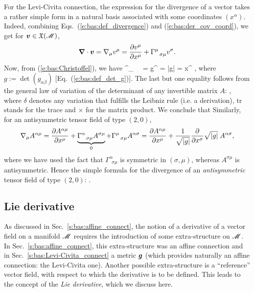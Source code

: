 For the Levi-Civita connection, the expression for the divergence of a vector takes
a rather simple form in a natural basis associated with some coordinates $(x^\alpha)$.
Indeed, combining Eqs.~(\ref{e:bas:def_divergence}) and (\ref{e:bas:der_cov_coord}),
we get for $\bm{v}\in\mathfrak{X}(\mathscr{M})$,
\[
  \bm{\nabla}\cdot\bm{v} = \nabla_\mu v^\mu = \frac{\partial v^\mu}{\partial x^\mu} + \Gamma^\mu_{\ \ \sigma\mu} v^\sigma   .
\]
Now, from (\ref{e:bas:Christoffel}),  we have
\be \label{e:bas:trGam_det_g}
  \Gamma^\mu_{\ \ \alpha\mu} =   g^{\mu\nu} 
  =   \ln|g|
  = \der{} {x^\alpha}  ,
\ee
where $g := \det(g_{\alpha\beta})$ [Eq.~(\ref{e:bas:def_det_g})].
The last but one equality follows from the general law of variation of the determinant of any
invertible matrix $A$:
\be \label{e:bas:variation_det}
     ,
\ee
where $\delta$ denotes any variation that fulfills the Leibniz rule (i.e. a derivation),
$\mathrm{tr}$ stands for the trace and $\times$ for the matrix product.
We conclude that
\be \label{e:bas:div_vect}
\ee
Similarly, for an antisymmetric tensor field of type $(2,0)$,
\[
   \nabla_\mu A^{\alpha\mu}
  = \frac{\partial A^{\alpha\mu}}{\partial x^\mu} +
  \underbrace{\Gamma^\alpha_{\ \ \sigma\mu} A^{\sigma\mu}}_{0}
  + \Gamma^\mu_{\ \ \sigma\mu} A^{\alpha\sigma}
  = \frac{\partial A^{\alpha\mu}}{\partial x^\mu} +  \frac{1}{\sqrt{|g|}}\frac{\partial }{\partial x^\sigma} \sqrt{|g|}
  \;  A^{\alpha\sigma} ,
\]
where we have used the fact that $\Gamma^\alpha_{\ \ \sigma\mu}$ is symmetric in
$(\sigma,\mu)$, whereas $A^{\sigma\mu}$ is antisymmetric.
Hence the simple formula for the divergence of an \emph{antisymmetric} tensor field
of type $(2,0)$:
\be \label{e:bas:div_antisym}
   .
\ee


\subsection{Lie derivative} \label{s:bas:Lie}

As discussed in Sec.~\ref{s:bas:affine_connect}, the notion of a derivative of a vector field on a manifold $\mathscr{M}$
requires the introduction of some extra-structure on $\mathscr{M}$.
In Sec.~\ref{s:bas:affine_connect}, this extra-structure was an affine connection
and in Sec.~\ref{s:bas:Levi-Civita_connect} a metric
$\bm{g}$ (which provides naturally an affine connection: the Levi-Civita one).
Another possible extra-structure is a ``reference''
vector field, with respect to which the derivative is to be defined. This leads to the
concept of the \emph{Lie derivative}, which we discuss here.


